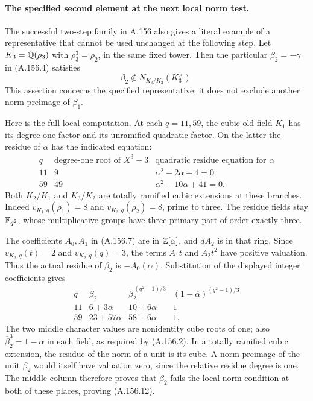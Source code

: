 \paragraph{The specified second element at the next local norm test.}
The successful two-step family in A.156 also gives a literal
example of a representative that cannot be used unchanged at the
following step.  Let \(K_3=\mathbb Q(\rho_3)\) with
\(\rho_3^3=\rho_2\), in the same fixed tower.
Then the particular \(\beta_2=-\gamma\) in (A.156.4) satisfies
\[
                 \beta_2\notin N_{K_3/K_2}(K_3^\times).
\tag{A.156.12}
\]
This assertion concerns the specified representative; it does not
exclude another norm preimage of \(\beta_1\).

Here is the full local computation.  At each \(q=11,59\),
the cubic old field \(K_1\) has its degree-one factor and its
unramified quadratic factor.  On the latter the residue of \(\alpha\)
has the indicated equation:
\[
 \begin{array}{c|c|c}
 q&\text{degree-one root of }X^3-3&
          \text{quadratic residue equation for }\alpha\\\hline
 11&9&\alpha^2-2\alpha+4=0\\
 59&49&\alpha^2-10\alpha+41=0.
 \end{array}
\tag{A.156.13}
\]
Both \(K_2/K_1\) and \(K_3/K_2\) are totally ramified cubic
extensions at these branches.  Indeed \(v_{K_1,q}(\rho_1)=8\)
and \(v_{K_2,q}(\rho_2)=8\), prime to three.
The residue fields stay \(\mathbb F_{q^2}\), whose multiplicative groups
have three-primary part of order exactly three.

The coefficients \(A_0,A_1\) in (A.156.7) are in
\(\mathbb Z[\alpha]\), and \(dA_2\) is in that ring.
Since \(v_{K_2,q}(t)=2\) and \(v_{K_2,q}(q)=3\),
the terms \(A_1t\) and \(A_2t^2\) have positive valuation.
Thus the actual residue of \(\beta_2\) is \(-A_0(\alpha)\).
Substitution of the displayed integer coefficients gives
\[
 \begin{array}{c|c|c|c}
 q&\overline\beta_2&
       \overline\beta_2^{\,(q^2-1)/3}&
       (1-\overline\alpha)^{(q^2-1)/3}\\\hline
 11&6+3\overline\alpha&10+6\overline\alpha&1\\
 59&23+57\overline\alpha&58+6\overline\alpha&1.
 \end{array}
\tag{A.156.14}
\]
The two middle character values are nonidentity cube roots of one;
also \(\overline\beta_2^3=1-\overline\alpha\) in each field,
as required by (A.156.2).
In a totally ramified cubic extension, the residue of the norm
of a unit is its cube.  A norm preimage of the unit \(\beta_2\)
would itself have valuation zero, since the relative residue degree
is one.  The middle column therefore proves that \(\beta_2\)
fails the local norm condition at both of these places, proving
(A.156.12).

